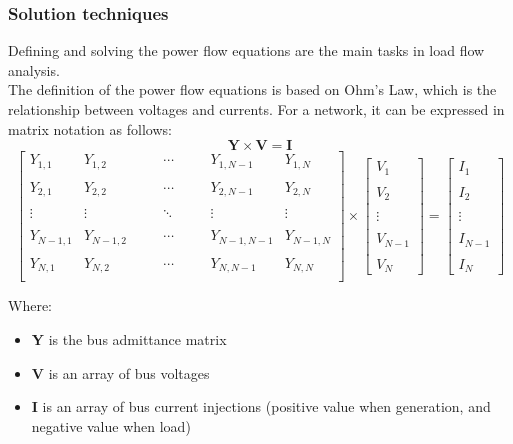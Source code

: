 \subsubsection{Solution techniques}
Defining and solving the power flow equations are the main tasks in load flow analysis. \\
The definition of the power flow equations is based on Ohm’s Law, which is the relationship between voltages and currents. For a network, it can be expressed in matrix notation as follows:
\[
    \mathbf{Y} \times \mathbf{V} = \mathbf{I}
\]
\[
 \begin{bmatrix}
 Y_{1,1} & Y_{1,2} & \quad & \cdots & \quad & Y_{1,N-1} & Y_{1,N} \\
 & & & & & & \\
 Y_{2,1} & Y_{2,2} & \quad & \cdots & \quad & Y_{2,N-1} & Y_{2,N} \\
 & & & & & & \\
 
 \vdots & \vdots & \quad & \ddots & \quad & \vdots & \vdots \\
 & & & & & & \\
 
 Y_{N-1,1} & Y_{N-1,2} & \quad & \cdots & \quad & Y_{N-1,N-1} & Y_{N-1,N} \\
 & & & & & & \\
 Y_{N,1} & Y_{N,2} & \quad & \cdots & \quad & Y_{N,N-1} & Y_{N,N} \\
 \end{bmatrix}
 \times
 \begin{bmatrix}
 V_1 \\ \\ V_2 \\ \\ \vdots \\ \\ V_{N-1} \\ \\ V_N
 \end{bmatrix}
 =
 \begin{bmatrix}
 I_1 \\  \\ I_2 \\ \\ \vdots \\ \\ I_{N-1} \\ \\ I_N
 \end{bmatrix}
\]

\noindent Where:
\begin{itemize}
    \item \textbf{Y} is the bus admittance matrix
    \item \textbf{V} is an array of bus voltages
    \item \textbf{I} is an array of bus current injections (positive value when generation, and negative value when load)
\end{itemize}

